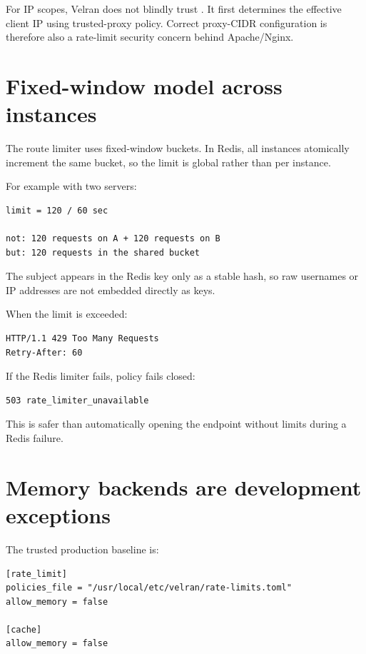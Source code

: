 For IP scopes, Velran does not blindly trust . It first determines the effective client IP using trusted-proxy policy. Correct proxy-CIDR configuration is therefore also a rate-limit security concern behind Apache/Nginx.

\section{Fixed-window model across instances}

The route limiter uses fixed-window buckets. In Redis, all instances atomically increment the same bucket, so the limit is global rather than per instance.

For example with two servers:

\begin{lstlisting}
limit = 120 / 60 sec

not: 120 requests on A + 120 requests on B
but: 120 requests in the shared bucket
\end{lstlisting}

The subject appears in the Redis key only as a stable hash, so raw usernames or IP addresses are not embedded directly as keys.

When the limit is exceeded:

\begin{lstlisting}
HTTP/1.1 429 Too Many Requests
Retry-After: 60
\end{lstlisting}

If the Redis limiter fails, policy fails closed:

\begin{lstlisting}
503 rate_limiter_unavailable
\end{lstlisting}

This is safer than automatically opening the endpoint without limits during a Redis failure.

\section{Memory backends are development exceptions}

The trusted production baseline is:

\begin{lstlisting}
[rate_limit]
policies_file = "/usr/local/etc/velran/rate-limits.toml"
allow_memory = false

[cache]
allow_memory = false
\end{lstlisting}

